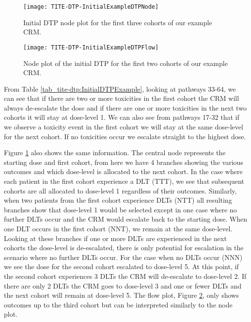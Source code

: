 \begin{figure}[h!]
	\centering
	\caption[Initial DTP node plot.]{Initial DTP node plot for the first three cohorts of our example CRM.}
	\label{fig_tite-dtp:InitialDTPExampleNode}
	\texttt{[image: TITE-DTP-InitialExampleDTPNode]}
\end{figure}

\begin{figure}[h!]
	\centering
	\caption[Initial DTP flow plot.]{Node plot of the initial DTP for the first two cohorts of our example CRM.}
	\label{fig_tite-dtp:InitialDTPExampleFlow}
	\texttt{[image: TITE-DTP-InitialExampleDTPFlow]}
\end{figure}

From Table \ref{tab_tite-dtp:InitialDTPExample}, looking at pathways 33-64, we can see that if there are two or more toxicities in the first cohort the CRM will always de-escalate the dose and if there are one or more toxicities in the next two cohorts it will stay at dose-level 1. We can also see from pathways 17-32 that if we observe a toxicity event in the first cohort we will stay at the same dose-level for the next cohort. If no toxicities occur we escalate straight to the highest dose. 

Figure \ref{fig_tite-dtp:InitialDTPExampleNode} also shows the same information. The central node represents the starting dose and first cohort, from here we have 4 branches showing the various outcomes and which dose-level is allocated to the next cohort. In the case where each patient in the first cohort experience a DLT (TTT), we see that subsequent cohorts are all allocated to dose-level 1 regardless of their outcomes. Similarly, when two patients from the first cohort experience DLTs (NTT) all resulting branches show that dose-level 1 would be selected except in one case where no further DLTs occur and the CRM would escalate back to the starting dose. When one DLT occurs in the first cohort (NNT), we remain at the same dose-level. Looking at these branches if one or more DLTs are experienced in the next cohorts the dose-level is de-escalated, there is only potential for escalation in the scenario where no further DLTs occur. For the case when no DLTs occur (NNN) we see the dose for the second cohort escalated to dose-level 5. At this point, if the second cohort experiences 3 DLTs the CRM will de-escalate to dose-level 2. If there are only 2 DLTs the CRM goes to dose-level 3 and one or fewer DLTs and the next cohort will remain at dose-level 5. The flow plot, Figure \ref{fig_tite-dtp:InitialDTPExampleFlow}, only shows outcomes up to the third cohort but can be interpreted similarly to the node plot.

